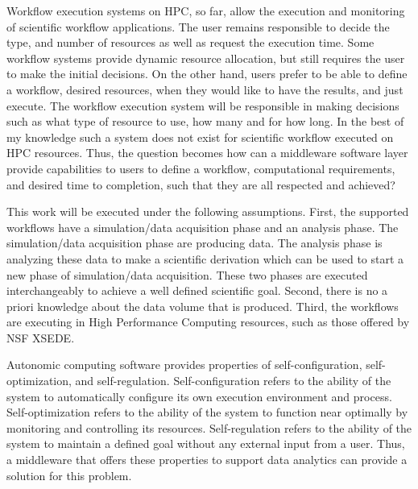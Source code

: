 Workflow execution systems on HPC, so far, allow the execution and monitoring of 
scientific workflow applications. The user remains responsible to decide the type, 
and number of resources as well as request the execution time. Some workflow 
systems provide dynamic resource allocation, but still requires the user to make 
the initial decisions.  On the other hand, users prefer to be able to define a 
workflow, desired resources, when they would like to have the results, and just 
execute. The workflow execution system will be responsible in making decisions 
such as what type of resource to use, how many and for how long. In the best of 
my knowledge such a system does not exist for scientific workflow executed on HPC 
resources. Thus, the question becomes how can a middleware software layer provide 
capabilities to users to define a workflow, computational requirements, and 
desired time to completion, such that they are all respected and achieved?


This work will be executed under the following assumptions. First, the supported 
workflows have a simulation/data acquisition phase and an analysis phase. The 
simulation/data acquisition phase are producing data. The analysis phase is analyzing 
these data to make a scientific derivation which can be used to start a new phase 
of simulation/data acquisition. These two phases are executed interchangeably to 
achieve a well defined scientific goal. Second, there is no a priori knowledge 
about the data volume that is produced. Third, the workflows are executing in 
High Performance Computing resources, such as those offered by NSF XSEDE.


Autonomic computing software provides properties of self-configuration, self-optimization, 
and self-regulation. Self-configuration refers to the ability of the system to 
automatically configure its own execution environment and process. Self-optimization 
refers to the ability of the system to function near optimally by monitoring and 
controlling its resources. Self-regulation refers to the ability of the system to 
maintain a defined goal without any external input from a user. Thus, a middleware 
that offers these properties to support data analytics can provide a solution for 
this problem.

